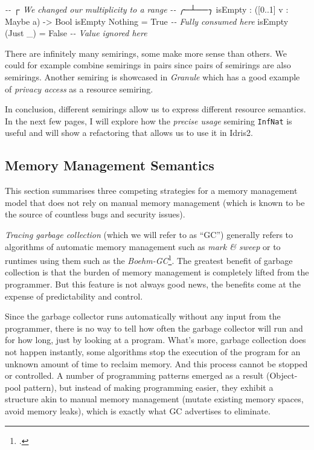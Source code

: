 \documentclass[
]{article}
\newenvironment{Shaded}{}{}
\newcommand{\CommentTok}[1]{\textcolor[rgb]{0.38,0.63,0.69}{\textit{#1}}}
\newcommand{\DataTypeTok}[1]{\textcolor[rgb]{0.56,0.13,0.00}{#1}}
\newcommand{\DecValTok}[1]{\textcolor[rgb]{0.25,0.63,0.44}{#1}}
\newcommand{\NormalTok}[1]{#1}
\newcommand{\OperatorTok}[1]{\textcolor[rgb]{0.40,0.40,0.40}{#1}}
\newcommand{\OtherTok}[1]{\textcolor[rgb]{0.00,0.44,0.13}{#1}}
\begin{document}
\begin{Shaded}
\begin{Highlighting}[]
\CommentTok{{-}{-}           ┌ We changed our multiplicity to a range}
\CommentTok{{-}{-}         ╭─┴──╮}
\NormalTok{isEmpty }\OperatorTok{:}\NormalTok{ ([}\DecValTok{0}\OperatorTok{..}\DecValTok{1}\NormalTok{] v }\OperatorTok{:} \DataTypeTok{Maybe}\NormalTok{ a) }\OtherTok{{-}\textgreater{}} \DataTypeTok{Bool}
\NormalTok{isEmpty }\DataTypeTok{Nothing} \OtherTok{=} \DataTypeTok{True}   \CommentTok{{-}{-} Fully consumed here}
\NormalTok{isEmpty (}\DataTypeTok{Just}\NormalTok{ \_) }\OtherTok{=} \DataTypeTok{False} \CommentTok{{-}{-} Value ignored here}
\end{Highlighting}
\end{Shaded}

There are infinitely many semirings, some make more sense than others.
We could for example combine semirings in pairs since pairs of semirings
are also semirings. Another semiring is showcased in
\emph{Granule}\cite{granule} which has a good example of \emph{privacy
access} as a resource semiring.

In conclusion, different semirings allow us to express different
resource semantics. In the next few pages, I will explore how the
\emph{precise usage} semiring \texttt{InfNat} is useful and will show a
refactoring that allows us to use it in Idris2.

\hypertarget{memory-management-semantics}{%
\subsection{Memory Management
Semantics}\label{memory-management-semantics}}

This section summarises three competing strategies for a memory
management model that does not rely on manual memory management (which
is known to be the source of countless bugs and security issues).

\emph{Tracing garbage collection} (which we will refer to as ``GC'')
generally refers to algorithms of automatic memory management such as
\emph{mark \& sweep} or to runtimes using them such as the
\emph{Boehm-GC}\footnote{.}. The greatest benefit of garbage collection
is that the burden of memory management is completely lifted from the
programmer. But this feature is not always good news, the benefits come
at the expense of predictability and control.

Since the garbage collector runs automatically without any input from
the programmer, there is no way to tell how often the garbage collector
will run and for how long, just by looking at a program. What's more,
garbage collection does not happen instantly, some algorithms stop the
execution of the program for an unknown amount of time to reclaim
memory. And this process cannot be stopped or controlled. A number of
programming patterns emerged as a result (Object-pool pattern), but
instead of making programming easier, they exhibit a structure akin to
manual memory management (mutate existing memory spaces, avoid memory
leaks), which is exactly what GC advertises to eliminate.
\end{document}
